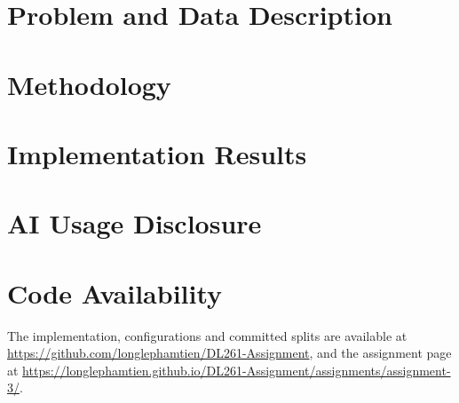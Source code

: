 \documentclass[a4paper]{article}
\theoremstyle{definition}
\begin{document}
\pagebreak
\tableofcontents
\pagebreak
\listoffigures{}
\listoftables{}
\pagebreak

\section{Problem and Data Description}
\label{sec:problem-and-data}


\section{Methodology}
\label{sec:methodology}


\section{Implementation Results}
\label{sec:results}


\section{AI Usage Disclosure}
\label{sec:ai-usage}


\section*{Code Availability}
The implementation, configurations and committed splits are available at
\url{https://github.com/longlephamtien/DL261-Assignment}, and the assignment page at
\url{https://longlephamtien.github.io/DL261-Assignment/assignments/assignment-3/}.

\nocite{paszke2019pytorch}
\printbibliography
{}
\end{document}
